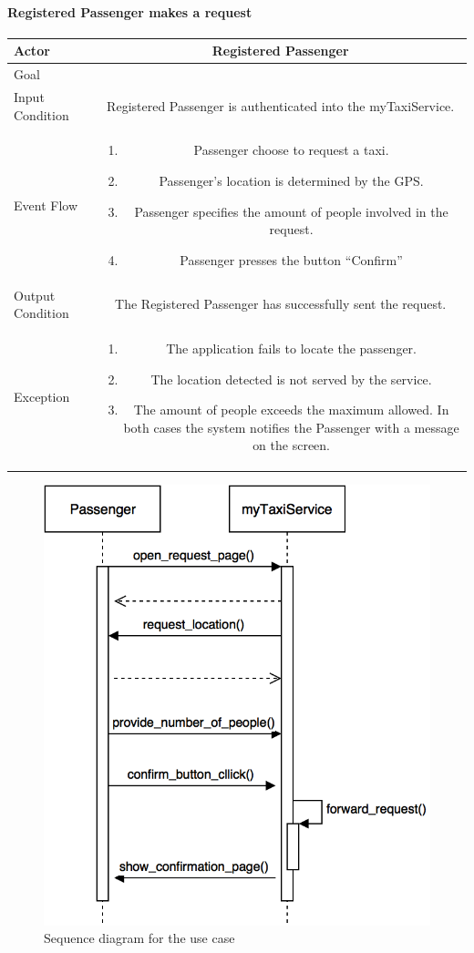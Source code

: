 \documentclass[a4paper,12pt]{article}%
\newcommand{\usecasetable}[6]{
\begin{center}
\def\arraystretch{1.5}
\begin{tabularx}{\textwidth}{|s|C|}
\hline
Actor & #1\\
\hline
Goal & #2\\
\hline
Input Condition & #3 \\
\hline
Event Flow & #4\\
\hline
Output Condition & #5\\
\hline
Exception & #6\\
\hline
\end{tabularx}
\end{center}
}
\begin{document}
\paragraph{Registered Passenger makes a request}
\usecasetable{Registered Passenger}{}{Registered Passenger is authenticated into the  myTaxiService.}
{
\begin{minipage}[b]{11cm}
\begin{enumerate}
\item Passenger choose to request a taxi.
\item Passenger's location is determined by the GPS.
\item Passenger specifies the amount of people involved in the request.
\item Passenger presses the button ``Confirm''
\end{enumerate}
\end{minipage}
}
{The Registered Passenger has successfully sent the request.}
{

\begin{minipage}[b]{11cm}
\begin{enumerate}
\item The application fails to locate the passenger.
\item The location detected is not served by the service.
\item The amount of people exceeds the maximum allowed.
In both cases the system notifies the Passenger with a message on the screen.
\end{enumerate}
\end{minipage}
}
\begin{figure}[H]
\centering
\includegraphics[scale=.3]{make_request.png}
\caption{Sequence diagram for the use case}
\end{figure}
\break
\end{document}
